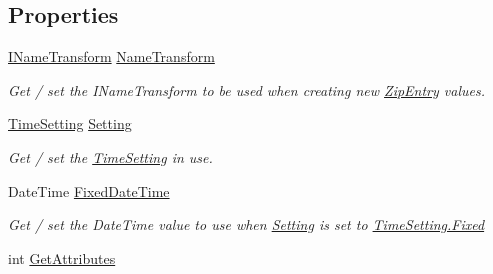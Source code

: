 \subsection*{Properties}
\begin{DoxyCompactItemize}
\item 
\hyperlink{interface_i_c_sharp_code_1_1_sharp_zip_lib_1_1_core_1_1_i_name_transform}{I\+Name\+Transform} \hyperlink{class_i_c_sharp_code_1_1_sharp_zip_lib_1_1_zip_1_1_zip_entry_factory_ac452ec24ad2513cb4b803021c31723d4}{Name\+Transform}
\begin{DoxyCompactList}\small\item\em Get / set the I\+Name\+Transform to be used when creating new \hyperlink{class_i_c_sharp_code_1_1_sharp_zip_lib_1_1_zip_1_1_zip_entry}{Zip\+Entry} values. \end{DoxyCompactList}\item 
\hyperlink{class_i_c_sharp_code_1_1_sharp_zip_lib_1_1_zip_1_1_zip_entry_factory_a10d0f2a1e64abd09ea6abac4d34a9955}{Time\+Setting} \hyperlink{class_i_c_sharp_code_1_1_sharp_zip_lib_1_1_zip_1_1_zip_entry_factory_a24146ff4b08ed14235b6055ba047e72a}{Setting}
\begin{DoxyCompactList}\small\item\em Get / set the \hyperlink{class_i_c_sharp_code_1_1_sharp_zip_lib_1_1_zip_1_1_zip_entry_factory_a10d0f2a1e64abd09ea6abac4d34a9955}{Time\+Setting} in use. \end{DoxyCompactList}\item 
Date\+Time \hyperlink{class_i_c_sharp_code_1_1_sharp_zip_lib_1_1_zip_1_1_zip_entry_factory_aeb39fdaf985746bbdba661be7850693a}{Fixed\+Date\+Time}
\begin{DoxyCompactList}\small\item\em Get / set the Date\+Time value to use when \hyperlink{class_i_c_sharp_code_1_1_sharp_zip_lib_1_1_zip_1_1_zip_entry_factory_a24146ff4b08ed14235b6055ba047e72a}{Setting} is set to \hyperlink{class_i_c_sharp_code_1_1_sharp_zip_lib_1_1_zip_1_1_zip_entry_factory_a10d0f2a1e64abd09ea6abac4d34a9955a4457d440870ad6d42bab9082d9bf9b61}{Time\+Setting.\+Fixed} \end{DoxyCompactList}\item 
int \hyperlink{class_i_c_sharp_code_1_1_sharp_zip_lib_1_1_zip_1_1_zip_entry_factory_ade0dec51500cfbe274dfbfa0325e0c38}{Get\+Attributes}

\end{DoxyCompactItemize}
